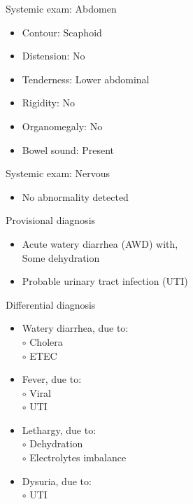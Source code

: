 \documentclass[10pt]{beamer}
\begin{document}
{
\begin{frame}{Systemic exam: Abdomen}
	\begin{itemize}
		\item Contour: Scaphoid
		\item Distension: No
		\item Tenderness: Lower abdominal
		\item Rigidity: No
		\item Organomegaly: No
		\item Bowel sound: Present
	\end{itemize}
\end{frame}
}

{
\begin{frame}{Systemic exam: Nervous}
	\begin{itemize}
		\item No abnormality detected
	\end{itemize}
\end{frame}
}

{
\begin{frame}{Provisional diagnosis}
	\begin{itemize}
		\item Acute watery diarrhea (AWD) with, \\
		Some dehydration
		\item Probable urinary tract infection (UTI)
	\end{itemize}
\end{frame}
}

{
	\begin{frame}{Differential diagnosis}
		\begin{itemize}
			\item Watery diarrhea, due to: \\
			{\color{red}$\circ$} Cholera \\
			{\color{red}$\circ$} ETEC
			\item Fever, due to: \\
			{\color{red}$\circ$} Viral \\
			{\color{red}$\circ$} UTI 
			\item Lethargy, due to:\\
			{\color{red}$\circ$} Dehydration \\
			{\color{red}$\circ$} Electrolytes imbalance
			\item Dysuria, due to: \\
			{\color{red}$\circ$} UTI
		\end{itemize}
	\end{frame}	
}
\end{document}
